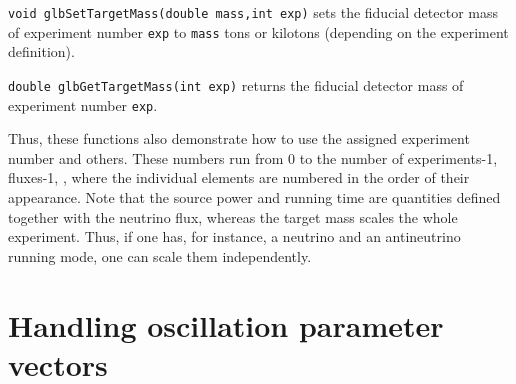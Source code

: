 \begin{function}
{\tt void glbSetTargetMass(double mass,int exp)}
sets the fiducial detector mass of experiment number {\tt exp} to {\tt mass} tons or kilotons (depending on the experiment definition).
\end{function}
\begin{function}
{\tt double glbGetTargetMass(int exp)}
returns the fiducial detector mass of experiment number {\tt exp}.
\end{function}
Thus, these functions also demonstrate how to use the assigned experiment number and others. These numbers run from $0$ to the number of experiments-1, fluxes-1, \etc, where the individual elements are numbered in the order of their appearance. 
 Note that the source power and running time are quantities defined
together with the neutrino flux, whereas the target mass scales the whole
experiment. Thus, if one has, for instance, a neutrino and an antineutrino
running mode, one can scale them independently.

\section{Handling oscillation parameter vectors}

